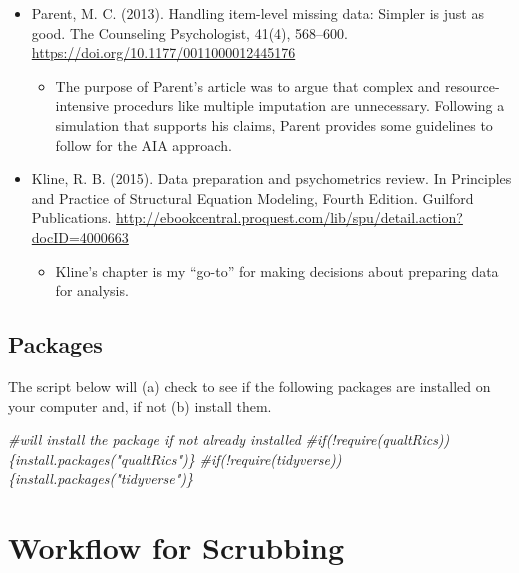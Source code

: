 \documentclass[
  11pt,
]{book}
\newenvironment{Shaded}{\begin{snugshade}}{\end{snugshade}}
\newcommand{\CommentTok}[1]{\textcolor[rgb]{0.37,0.37,0.37}{\textit{#1}}}
\providecommand{\tightlist}{%
  \setlength{\itemsep}{0pt}\setlength{\parskip}{0pt}}
\begin{document}
\begin{itemize}
\tightlist
\item
  Parent, M. C. (2013). Handling item-level missing data: Simpler is just as good. The Counseling Psychologist, 41(4), 568--600. \url{https://doi.org/10.1177/0011000012445176}

  \begin{itemize}
  \tightlist
  \item
    The purpose of Parent's article was to argue that complex and resource-intensive procedurs like multiple imputation are unnecessary. Following a simulation that supports his claims, Parent provides some guidelines to follow for the AIA approach.
  \end{itemize}
\item
  Kline, R. B. (2015). Data preparation and psychometrics review. In Principles and Practice of Structural Equation Modeling, Fourth Edition. Guilford Publications. \url{http://ebookcentral.proquest.com/lib/spu/detail.action?docID=4000663}

  \begin{itemize}
  \tightlist
  \item
    Kline's chapter is my ``go-to'' for making decisions about preparing data for analysis.
  \end{itemize}
\end{itemize}

\hypertarget{packages}{%
\subsection{Packages}\label{packages}}

The script below will (a) check to see if the following packages are installed on your computer and, if not (b) install them.

\begin{Shaded}
\begin{Highlighting}[]
\CommentTok{\#will install the package if not already installed}
\CommentTok{\#if(!require(qualtRics))\{install.packages("qualtRics")\}}
\CommentTok{\#if(!require(tidyverse))\{install.packages("tidyverse")\}}
\end{Highlighting}
\end{Shaded}

\hypertarget{workflow-for-scrubbing}{%
\section{Workflow for Scrubbing}\label{workflow-for-scrubbing}}
\end{document}
